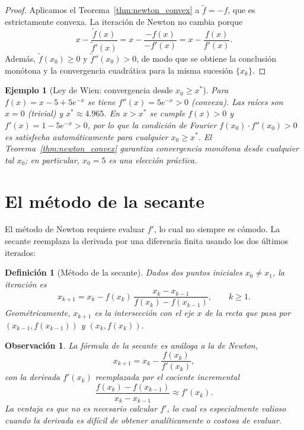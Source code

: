 \documentclass[a4paper,11pt]{report}
\newtheorem{definition}[theorem]{Definición}
\newtheorem{example}[theorem]{Ejemplo}
\newtheorem{remark}[theorem]{Observación}
\begin{document}
\begin{proof}
Aplicamos el Teorema~\ref{thm:newton_convex} a $\tilde f=-f$, que es estrictamente convexa.
La iteración de Newton no cambia porque
\[
x-\frac{\tilde f(x)}{\tilde f'(x)}=x-\frac{-f(x)}{-f'(x)}=x-\frac{f(x)}{f'(x)}.
\]
Además, $\tilde f(x_0)\ge 0$ y $\tilde f''(x_0)>0$, de modo que se obtiene la conclusión
monótona y la convergencia cuadrática para la misma sucesión $\{x_k\}$.
\end{proof}

\begin{example}[Ley de Wien: convergencia desde $x_0\ge x^*$]
Para $f(x)=x-5+5e^{-x}$ se tiene $f''(x)=5e^{-x}>0$ (convexa).
Las raíces son $x=0$ (trivial) y $x^*\approx 4.965$.
En $x>x^*$ se cumple $f(x)>0$ y $f'(x)=1-5e^{-x}>0$, por lo que
la condición de Fourier $f(x_0)\cdot f''(x_0)>0$ es satisfecha automáticamente
para cualquier $x_0\ge x^*$.
El Teorema~\ref{thm:newton_convex} garantiza convergencia monótona desde cualquier
tal $x_0$; en particular, $x_0=5$ es una elección práctica.
\end{example}

\section{El método de la secante}
\label{sec:secante}

El método de Newton requiere evaluar $f'$, lo cual no siempre es cómodo.
La secante reemplaza la derivada por una diferencia finita usando los dos
últimos iterados:

\begin{definition}[Método de la secante]\label{def:secante}
Dados dos puntos iniciales $x_0\ne x_1$, la iteración es
\[
x_{k+1}=x_k-f(x_k)\,\frac{x_k-x_{k-1}}{f(x_k)-f(x_{k-1})},\qquad k\ge 1.
\]
Geométricamente, $x_{k+1}$ es la intersección con el eje $x$ de la recta
que pasa por $(x_{k-1},f(x_{k-1}))$ y $(x_k,f(x_k))$.
\end{definition}

\begin{remark}
La fórmula de la secante es análoga a la de Newton,
\[
x_{k+1}=x_k-\frac{f(x_k)}{f'(x_k)},
\]
con la derivada $f'(x_k)$ reemplazada por el cociente incremental
\[
\frac{f(x_k)-f(x_{k-1})}{x_k-x_{k-1}}\approx f'(x_k).
\]
La ventaja es que no es necesario calcular $f'$, lo cual es especialmente valioso
cuando la derivada es difícil de obtener analíticamente o costosa de evaluar.
\end{remark}
\end{document}
